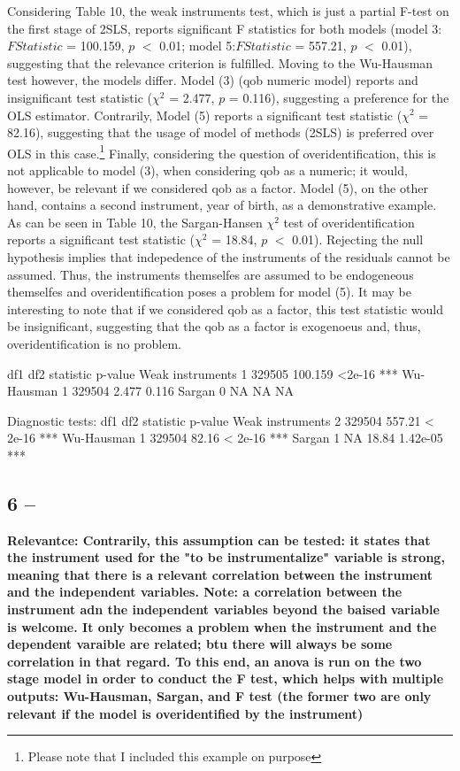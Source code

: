\documentclass[a4paper]{article}
\begin{document}
\indent Considering Table 10, the weak instruments test, which is just a partial F-test on the first stage of 2SLS, reports significant F statistics for both models (model 3: $F Statistic$ = 100.159, $p$ $<$ 0.01; model 5:$F Statistic$ = 557.21, $p$ $<$ 0.01), suggesting that the relevance criterion is fulfilled. Moving to the Wu-Hausman test however, the models differ. Model (3) (qob numeric model) reports and insignificant test statistic (${\chi}^2$ = 2.477, $p$ = 0.116), suggesting a preference for the OLS estimator. Contrarily, Model (5) reports a significant test statistic (${\chi}^2$ = 82.16), suggesting that the usage of model of methods (2SLS) is preferred over OLS in this case.\footnote{Please note that I included this example on purpose} Finally, considering the question of overidentification, this is not applicable to model (3), when considering qob as a numeric; it would, however, be relevant if we considered qob as a factor. Model (5), on the other hand, contains a second instrument, year of birth, as a demonstrative example. As can be seen in Table 10, the Sargan-Hansen ${\chi}^2$ test of overidentification reports a significant test statistic (${\chi}^2$ = 18.84, $p$ $<$ 0.01). Rejecting the null hypothesis implies that indepedence of the instruments of the residuals cannot be assumed. Thus, the instruments themselfes are assumed to be endogeneous themselfes and overidentification poses a problem for model (5). It may be interesting to note that if we considered qob as a factor, this test statistic would be insignificant, suggesting that the qob as a factor is exogenoeus and, thus, overidentification is no problem. 



                    df1    df2 statistic p-value    
Weak instruments      1 329505   100.159  <2e-16 ***
Wu-Hausman            1 329504     2.477   0.116    
Sargan                0     NA        NA      NA    

Diagnostic tests:
                    df1    df2 statistic  p-value    
Weak instruments      2 329504    557.21  < 2e-16 ***
Wu-Hausman            1 329504     82.16  < 2e-16 ***
Sargan                1     NA     18.84 1.42e-05 ***



\subsection{6 -- }
\textbf{Relevantce: Contrarily, this assumption can be tested: it states that the instrument used for the "to be instrumentalize" variable is strong, meaning that there is a relevant correlation between the instrument and the independent variables. Note: a correlation between the instrument adn the independent variables beyond the baised variable is welcome. It only becomes a problem when the instrument and the dependent varaible are related; btu there will always be some correlation in that regard. To this end, an anova is run on the two stage model in order to conduct the F test, which helps with multiple outputs: Wu-Hausman, Sargan, and F test (the former two are only relevant if the model is overidentified by the instrument)}
\end{document}
